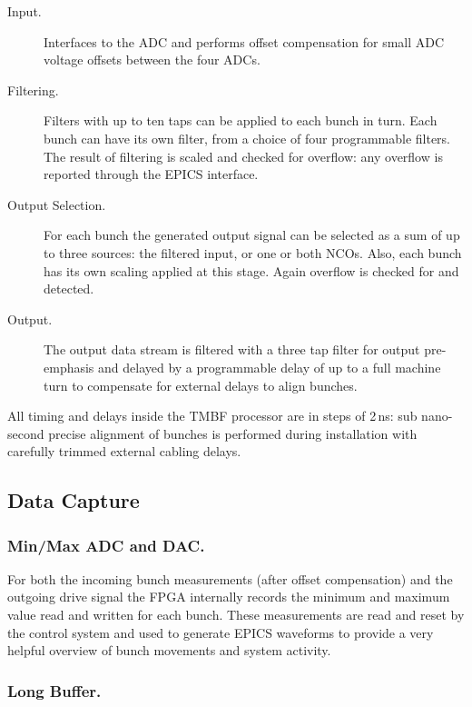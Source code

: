 \documentclass{JAC2003}
\begin{document}
\begin{description}

\item[Input.] Interfaces to the ADC and performs offset compensation for small
ADC voltage offsets between the four ADCs.

\item[Filtering.] Filters with up to ten taps can be applied to each bunch in
turn.  Each bunch can have its own filter, from a choice of four programmable
filters.  The result of filtering is scaled and checked for overflow: any
overflow is reported through the EPICS interface.

\item[Output Selection.] For each bunch the generated output signal can be
selected as a sum of up to three sources: the filtered input, or one or both
NCOs.  Also, each bunch has its own scaling applied at this stage.  Again
overflow is checked for and detected.

\item[Output.] The output data stream is filtered with a three tap filter
for output pre-emphasis and delayed by a programmable delay of up to a full
machine turn to compensate for external delays to align bunches.

\end{description}

All timing and delays inside the TMBF processor are in steps of 2\,ns: sub
nano-second precise alignment of bunches is performed during installation with
carefully trimmed external cabling delays.


\subsection{Data Capture}

\subsubsection{Min/Max ADC and DAC.}

For both the incoming bunch measurements (after offset compensation) and the
outgoing drive signal the FPGA internally records the minimum and maximum value
read and written for each bunch.  These measurements are read and reset by the
control system and used to generate EPICS waveforms to provide a very helpful
overview of bunch movements and system activity.

\subsubsection{Long Buffer.}
\end{document}
